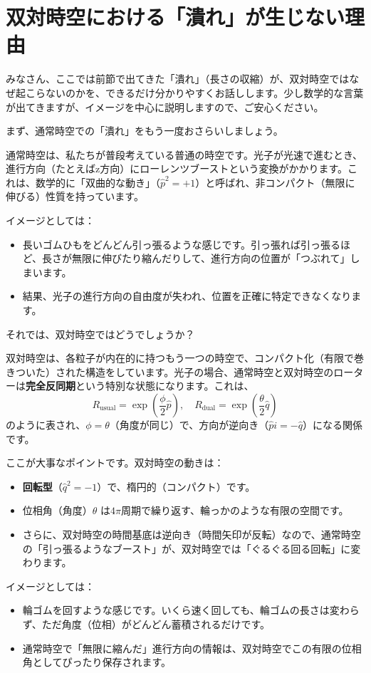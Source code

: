 \documentclass[dvipdfmx,12pt,a4paper]{article}
\begin{document}
\section{双対時空における「潰れ」が生じない理由}

みなさん、ここでは前節で出てきた「潰れ」（長さの収縮）が、双対時空ではなぜ起こらないのかを、できるだけ分かりやすくお話しします。少し数学的な言葉が出てきますが、イメージを中心に説明しますので、ご安心ください。

まず、通常時空での「潰れ」をもう一度おさらいしましょう。

通常時空は、私たちが普段考えている普通の時空です。光子が光速で進むとき、進行方向（たとえばz方向）にローレンツブーストという変換がかかります。これは、数学的に「双曲的な動き」（$\hat{p}^2 = +1$）と呼ばれ、非コンパクト（無限に伸びる）性質を持っています。

イメージとしては：
\begin{itemize}
  \item 長いゴムひもをどんどん引っ張るような感じです。引っ張れば引っ張るほど、長さが無限に伸びたり縮んだりして、進行方向の位置が「つぶれて」しまいます。
  \item 結果、光子の進行方向の自由度が失われ、位置を正確に特定できなくなります。
\end{itemize}

それでは、双対時空ではどうでしょうか？

双対時空は、各粒子が内在的に持つもう一つの時空で、コンパクト化（有限で巻きついた）された構造をしています。光子の場合、通常時空と双対時空のローターは\textbf{完全反同期}という特別な状態になります。これは、
\[
R_{\text{usual}} = \exp\left( \frac{\phi}{2} \hat{p} \right), \quad
R_{\text{dual}} = \exp\left( \frac{\theta}{2} \hat{q} \right)
\]
のように表され、$\phi = \theta$（角度が同じ）で、方向が逆向き（$\hat{p} i = -\hat{q}$）になる関係です。

ここが大事なポイントです。双対時空の動きは：
\begin{itemize}
  \item \textbf{回転型}（$\hat{q}^2 = -1$）で、楕円的（コンパクト）です。
  \item 位相角（角度）$\theta$ は$4\pi$周期で繰り返す、輪っかのような有限の空間です。
  \item さらに、双対時空の時間基底は逆向き（時間矢印が反転）なので、通常時空の「引っ張るようなブースト」が、双対時空では「ぐるぐる回る回転」に変わります。
\end{itemize}

イメージとしては：
\begin{itemize}
  \item 輪ゴムを回すような感じです。いくら速く回しても、輪ゴムの長さは変わらず、ただ角度（位相）がどんどん蓄積されるだけです。
  \item 通常時空で「無限に縮んだ」進行方向の情報は、双対時空でこの有限の位相角としてぴったり保存されます。
\end{itemize}
\end{document}
